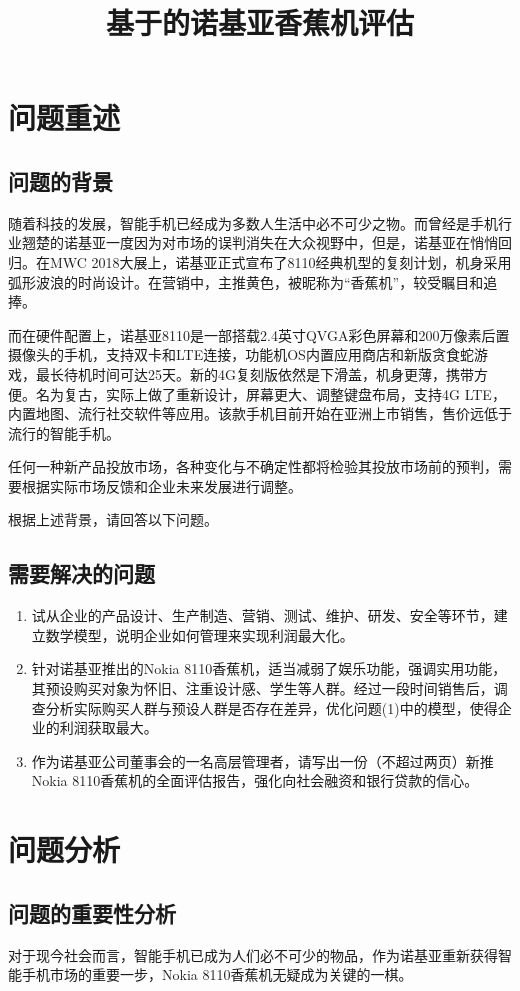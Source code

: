 \documentclass[12pt]{article}%
\title{ \heiti\zihao{3}基于的诺基亚香蕉机评估}
\author{}
\date{}
\begin{document}
\tableofcontents
\newpage
{}
\setcounter{page}{1}
\section{问题重述}
\subsection{问题的背景}
随着科技的发展，智能手机已经成为多数人生活中必不可少之物。而曾经是手机行业翘楚的诺基亚一度因为对市场的误判消失在大众视野中，但是，诺基亚在悄悄回归。在MWC 2018大展上，诺基亚正式宣布了8110经典机型的复刻计划，机身采用弧形波浪的时尚设计。在营销中，主推黄色，被昵称为“香蕉机”，较受瞩目和追捧。

而在硬件配置上，诺基亚8110是一部搭载2.4英寸QVGA彩色屏幕和200万像素后置摄像头的手机，支持双卡和LTE连接，功能机OS内置应用商店和新版贪食蛇游戏，最长待机时间可达25天。新的4G复刻版依然是下滑盖，机身更薄，携带方便。名为复古，实际上做了重新设计，屏幕更大、调整键盘布局，支持4G LTE，内置地图、流行社交软件等应用。该款手机目前开始在亚洲上市销售，售价远低于流行的智能手机。

任何一种新产品投放市场，各种变化与不确定性都将检验其投放市场前的预判，需要根据实际市场反馈和企业未来发展进行调整。

根据上述背景，请回答以下问题。

\subsection{需要解决的问题}
\begin{enumerate}[(1).]\addtolength{\itemsep}{-1.5ex}
\item 试从企业的产品设计、生产制造、营销、测试、维护、研发、安全等环节，建立数学模型，说明企业如何管理来实现利润最大化。
\item 针对诺基亚推出的Nokia 8110香蕉机，适当减弱了娱乐功能，强调实用功能，其预设购买对象为怀旧、注重设计感、学生等人群。经过一段时间销售后，调查分析实际购买人群与预设人群是否存在差异，优化问题(1)中的模型，使得企业的利润获取最大。
\item 作为诺基亚公司董事会的一名高层管理者，请写出一份（不超过两页）新推Nokia 8110香蕉机的全面评估报告，强化向社会融资和银行贷款的信心。
\end{enumerate}
\section{问题分析}
\subsection{问题的重要性分析}
对于现今社会而言，智能手机已成为人们必不可少的物品，作为诺基亚重新获得智能手机市场的重要一步，Nokia 8110香蕉机无疑成为关键的一棋。
\end{document}
